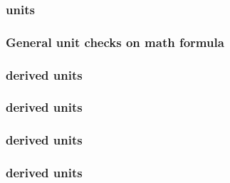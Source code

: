 \begin{sbmlenum}

\end{sbmlenum} \subsubsection*{ units} \begin{sbmlenum}


\end{sbmlenum}\subsubsection*{General unit checks on math formula} \begin{sbmlenum}


\end{sbmlenum} \subsubsection*{ derived units} \begin{sbmlenum}


\end{sbmlenum} \subsubsection*{ derived units} \begin{sbmlenum}

\end{sbmlenum} \subsubsection*{ derived units} \begin{sbmlenum}

\end{sbmlenum} \subsubsection*{ derived units} \begin{sbmlenum}


\end{sbmlenum}
